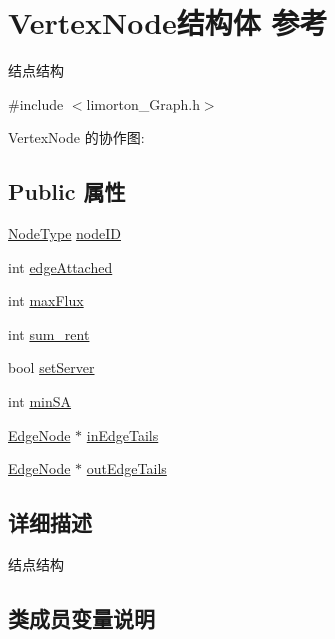 \hypertarget{struct_vertex_node}{}\section{Vertex\+Node结构体 参考}
\label{struct_vertex_node}


结点结构  




{\ttfamily \#include $<$limorton\+\_\+\+Graph.\+h$>$}



Vertex\+Node 的协作图\+:
\subsection*{Public 属性}
\begin{DoxyCompactItemize}
\item 
\hyperlink{limorton___graph_8h_a1b1a96beadaa686056e47989bf2a037e}{Node\+Type} \hyperlink{struct_vertex_node_a8c01ecf76399486e77309782e823d626}{node\+ID}
\item 
int \hyperlink{struct_vertex_node_adda4124beb2560e0ba9bf5bc47e2739a}{edge\+Attached}
\item 
int \hyperlink{struct_vertex_node_a6505db224a0d8e3cf29210d34ea8e541}{max\+Flux}
\item 
int \hyperlink{struct_vertex_node_a0b6c06ef71910aa0a91bd84f9c8f097b}{sum\+\_\+rent}
\item 
bool \hyperlink{struct_vertex_node_a014dc41c172b3e0f3b5e46bd62e42645}{set\+Server}
\item 
int \hyperlink{struct_vertex_node_a0bf361db57fb08db6b56e51ddbccb786}{min\+SA}
\item 
\hyperlink{struct_edge_node}{Edge\+Node} $\ast$ \hyperlink{struct_vertex_node_acacdd3f9e46d406f3a9d4ba9fd76e916}{in\+Edge\+Tails}
\item 
\hyperlink{struct_edge_node}{Edge\+Node} $\ast$ \hyperlink{struct_vertex_node_ac87a45b986765eaa9af84f281e9f736f}{out\+Edge\+Tails}
\end{DoxyCompactItemize}


\subsection{详细描述}
结点结构 

\subsection{类成员变量说明}
\mbox{\label{struct_vertex_node_adda4124beb2560e0ba9bf5bc47e2739a}} 
